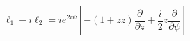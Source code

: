 \begin{equation}
\ell_{1}-i\ell_{2} = i e^{2i\psi}[-(1+z\bar{z})\frac{\partial}{\partial \bar{z}} +
\frac{i}{2} z \frac{\partial}{\partial \psi}]
\end{equation}


